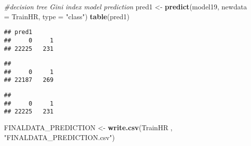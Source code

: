 \documentclass[
]{article}
\newenvironment{Shaded}{\begin{snugshade}}{\end{snugshade}}
\newcommand{\CommentTok}[1]{\textcolor[rgb]{0.56,0.35,0.01}{\textit{#1}}}
\newcommand{\DataTypeTok}[1]{\textcolor[rgb]{0.13,0.29,0.53}{#1}}
\newcommand{\DecValTok}[1]{\textcolor[rgb]{0.00,0.00,0.81}{#1}}
\newcommand{\FloatTok}[1]{\textcolor[rgb]{0.00,0.00,0.81}{#1}}
\newcommand{\KeywordTok}[1]{\textcolor[rgb]{0.13,0.29,0.53}{\textbf{#1}}}
\newcommand{\NormalTok}[1]{#1}
\newcommand{\OperatorTok}[1]{\textcolor[rgb]{0.81,0.36,0.00}{\textbf{#1}}}
\newcommand{\StringTok}[1]{\textcolor[rgb]{0.31,0.60,0.02}{#1}}
\begin{document}
\begin{Shaded}
\begin{Highlighting}[]
\CommentTok{#decision tree Gini index model prediction}
\NormalTok{pred1 <-}\StringTok{ }\KeywordTok{predict}\NormalTok{(model19, }\DataTypeTok{newdata =}\NormalTok{ TrainHR, }\DataTypeTok{type =} \StringTok{"class"}\NormalTok{)}
\KeywordTok{table}\NormalTok{(pred1)}
\end{Highlighting}
\end{Shaded}

\begin{verbatim}
## pred1
##     0     1 
## 22225   231
\end{verbatim}

\begin{Shaded}
\end{Shaded}

\begin{verbatim}
## 
##     0     1 
## 22187   269
\end{verbatim}

\begin{Shaded}
\end{Shaded}

\begin{verbatim}
## 
##     0     1 
## 22225   231
\end{verbatim}

\begin{Shaded}
\begin{Highlighting}[]
\NormalTok{FINALDATA_PREDICTION <-}\StringTok{ }\KeywordTok{write.csv}\NormalTok{(TrainHR , }\StringTok{"FINALDATA_PREDICTION.csv"}\NormalTok{)}
\end{Highlighting}
\end{Shaded}
\end{document}
